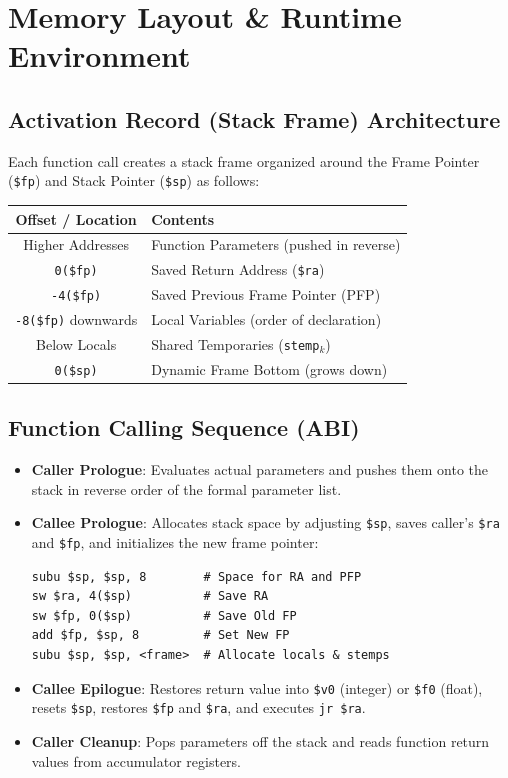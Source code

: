 \documentclass[10pt,twocolumn,a4paper]{article}
\begin{document}
\section{Memory Layout \& Runtime Environment}

\subsection{Activation Record (Stack Frame) Architecture}
Each function call creates a stack frame organized around the Frame Pointer (\texttt{\$fp}) and Stack Pointer (\texttt{\$sp}) as follows:

\begin{center}
\begin{tabular}{|c|l|}
\hline
\textbf{Offset / Location} & \textbf{Contents} \\
\hline
Higher Addresses & Function Parameters (pushed in reverse) \\
\texttt{0(\$fp)} & Saved Return Address (\texttt{\$ra}) \\
\texttt{-4(\$fp)} & Saved Previous Frame Pointer (PFP) \\
\texttt{-8(\$fp)} downwards & Local Variables (order of declaration) \\
Below Locals & Shared Temporaries (\texttt{stemp}$_k$) \\
\texttt{0(\$sp)} & Dynamic Frame Bottom (grows down) \\
\hline
\end{tabular}
\end{center}

\subsection{Function Calling Sequence (ABI)}
\begin{itemize}
    \item \textbf{Caller Prologue}: Evaluates actual parameters and pushes them onto the stack in reverse order of the formal parameter list.
    \item \textbf{Callee Prologue}: Allocates stack space by adjusting \texttt{\$sp}, saves caller's \texttt{\$ra} and \texttt{\$fp}, and initializes the new frame pointer:
\begin{lstlisting}[language={[x86masm]Assembler}]
subu $sp, $sp, 8        # Space for RA and PFP
sw $ra, 4($sp)          # Save RA
sw $fp, 0($sp)          # Save Old FP
add $fp, $sp, 8         # Set New FP
subu $sp, $sp, <frame>  # Allocate locals & stemps
\end{lstlisting}
    \item \textbf{Callee Epilogue}: Restores return value into \texttt{\$v0} (integer) or \texttt{\$f0} (float), resets \texttt{\$sp}, restores \texttt{\$fp} and \texttt{\$ra}, and executes \texttt{jr \$ra}.
    \item \textbf{Caller Cleanup}: Pops parameters off the stack and reads function return values from accumulator registers.
\end{itemize}
\end{document}
